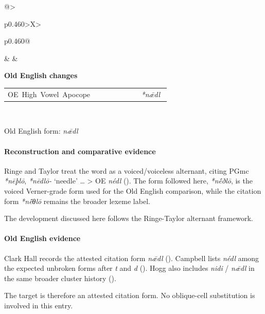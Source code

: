 \documentclass[
  british,
  a4paper,
]{article}
\begin{document}
{\begin{minipage}{0.97\linewidth}
\begin{tabularx}{\linewidth}{@{}>{\raggedright\arraybackslash}p{0.460\linewidth}>{\centering\arraybackslash}X>{\raggedright\arraybackslash}p{0.460\linewidth}@{}}
\begin{minipage}[t]{\linewidth}
\end{minipage}
&
&
\begin{minipage}[t]{\linewidth}
\centering\textbf{Old English changes}\par
\vspace{0.35em}
\raggedright
\begin{tabular}{@{}>{\raggedright\arraybackslash}p{0.74\linewidth}@{\hspace{0.55em}}>{\raggedright\arraybackslash}p{0.16\linewidth}@{\hspace{0.25em}}}
\mbox{OE High Vowel Apocope} & \emph{*nǣdl} \\
\end{tabular}
\end{minipage}
\\
\end{tabularx}
\end{minipage}%
} \endgroup

Old English form: \emph{nǣdl}

\paragraph{Reconstruction and comparative
evidence}\label{reconstruction-and-comparative-evidence-21}

Ringe and Taylor treat the word as a voiced/voiceless alternant, citing
PGmc \emph{*nēþlō}, \emph{*nēdlō-} `needle' \ldots{} \textgreater{} OE
\emph{nédl} (). The form followed here, \emph{*nḗðlō}, is the voiced Verner-grade
form used for the Old English comparison, while the citation form
\emph{*nḗθlō} remains the broader lexeme label.

The development discussed here follows the Ringe-Taylor alternant
framework.

\paragraph{Old English evidence}\label{old-english-evidence-21}

Clark Hall records the attested citation form \emph{nǣdl}
(). Campbell lists
\emph{nédl} among the expected unbroken forms after \emph{t} and
\emph{d} (). Hogg
also includes \emph{nidi} / \emph{nǣdl} in the same broader cluster
history ().

The target is therefore an attested citation form. No oblique-cell
substitution is involved in this entry.
\end{document}
